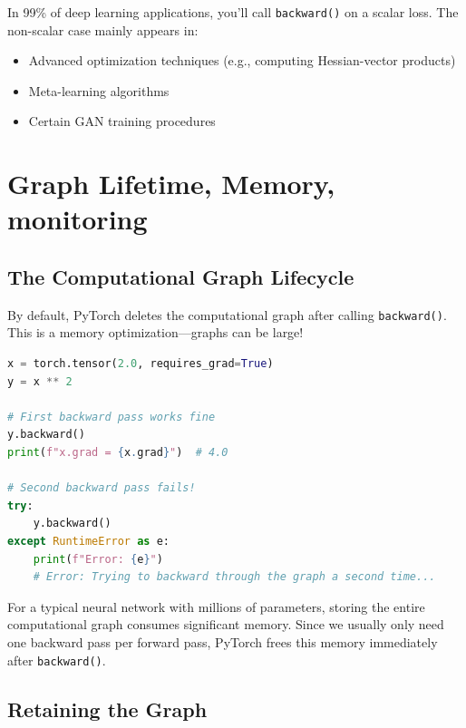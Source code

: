 \documentclass{article}
\begin{document}
\begin{tcolorbox}[colback=yellow!5!white, colframe=orange!50!black, title=Practical Tip]
In 99\% of deep learning applications, you'll call \texttt{backward()} on a scalar loss. The non-scalar case mainly appears in:
\begin{itemize}
    \item Advanced optimization techniques (e.g., computing Hessian-vector products)
    \item Meta-learning algorithms
    \item Certain GAN training procedures
\end{itemize}
\end{tcolorbox}
\section{Graph Lifetime, Memory, monitoring}

\subsection{The Computational Graph Lifecycle}

By default, PyTorch deletes the computational graph after calling \texttt{backward()}. This is a memory optimization—graphs can be large!

\begin{lstlisting}[language=Python]
x = torch.tensor(2.0, requires_grad=True)
y = x ** 2

# First backward pass works fine
y.backward()
print(f"x.grad = {x.grad}")  # 4.0

# Second backward pass fails!
try:
    y.backward()
except RuntimeError as e:
    print(f"Error: {e}")
    # Error: Trying to backward through the graph a second time...
\end{lstlisting}

\begin{tcolorbox}[colback=blue!5!white, colframe=blue!50!black, title=Why Delete the Graph?]
For a typical neural network with millions of parameters, storing the entire computational graph consumes significant memory. Since we usually only need one backward pass per forward pass, PyTorch frees this memory immediately after \texttt{backward()}.
\end{tcolorbox}

\subsection{Retaining the Graph}
\end{document}
